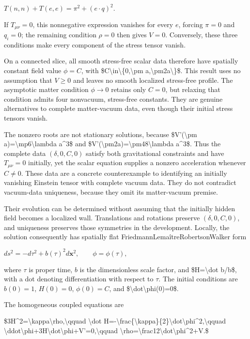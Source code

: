\documentclass[11pt]{article}
\begin{document}
$T(n,n)+T(e,e)=\pi^2+(e\cdot q)^2.$

If $T_{\mu\nu}=0$, this nonnegative expression vanishes for every $e$, forcing $\pi=0$ and $q_i=0$; the remaining condition $\rho=0$ then gives $V=0$. Conversely, these three conditions make every component of the stress tensor vanish.

On a connected slice, all smooth stress-free scalar data therefore have spatially constant field value $\phi=C$, with \$C\textbackslash{}in\textbackslash{}\{0,\textbackslash{}pm a,\textbackslash{}pm2a\textbackslash{}\}\$. This result uses no assumption that $V\geq0$ and leaves no smooth localized stress-free profile. The asymptotic matter condition $\phi\to0$ retains only $C=0$, but relaxing that condition admits four nonvacuum, stress-free constants. They are genuine alternatives to complete matter-vacuum data, even though their initial stress tensors vanish.

The nonzero roots are not stationary solutions, because \$V'(\textbackslash{}pm a)=\textbackslash{}mp6\textbackslash{}lambda a\textasciicircum{}3\$ and \$V'(\textbackslash{}pm2a)=\textbackslash{}pm48\textbackslash{}lambda a\textasciicircum{}3\$. Thus the complete data $(\delta,0,C,0)$ satisfy both gravitational constraints and have $T_{\mu\nu}=0$ initially, yet the scalar equation supplies a nonzero acceleration whenever $C\ne0$. These data are a concrete counterexample to identifying an initially vanishing Einstein tensor with complete vacuum data. They do not contradict vacuum-data uniqueness, because they omit its matter-vacuum premise.

Their evolution can be determined without assuming that the initially hidden field becomes a localized wall. Translations and rotations preserve $(\delta,0,C,0)$, and uniqueness preserves those symmetries in the development. Locally, the solution consequently has spatially flat Friedmann\textendash{}Lemaître\textendash{}Robertson\textendash{}Walker form

$ds^2=-d\tau^2+b(\tau)^2d\mathbf{x}^2,\qquad \phi=\phi(\tau),$

where $\tau$ is proper time, $b$ is the dimensionless scale factor, and \$H=\textbackslash{}dot b/b\$, with a dot denoting differentiation with respect to $\tau$. The initial conditions are $b(0)=1$, $H(0)=0$, $\phi(0)=C$, and \$\textbackslash{}dot\textbackslash{}phi(0)=0\$.

The homogeneous coupled equations are

\$3H\textasciicircum{}2=\textbackslash{}kappa\textbackslash{}rho,\textbackslash{}qquad \textbackslash{}dot H=-\textbackslash{}frac\{\textbackslash{}kappa\}\{2\}\textbackslash{}dot\textbackslash{}phi\textasciicircum{}2,\textbackslash{}qquad \textbackslash{}ddot\textbackslash{}phi+3H\textbackslash{}dot\textbackslash{}phi+V'=0,\textbackslash{}qquad \textbackslash{}rho=\textbackslash{}frac12\textbackslash{}dot\textbackslash{}phi\textasciicircum{}2+V.\$
\end{document}
